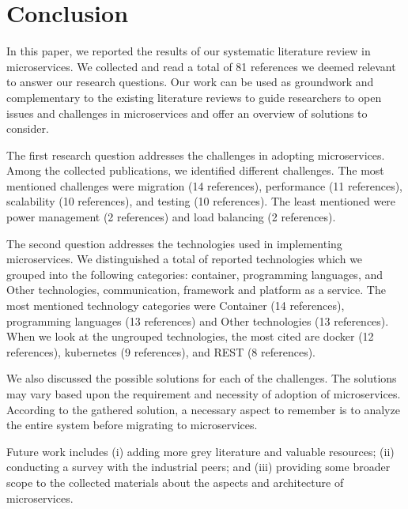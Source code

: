 
\section{Conclusion}\label{sec:conclusion}

In this paper, we reported the results of our systematic literature review in microservices. We collected and read a total of 81 references we deemed relevant to answer our research questions. Our work can be used as groundwork and complementary to the existing literature reviews to guide researchers to open issues and challenges in microservices and offer an overview of solutions to consider.

\par The first research question addresses the challenges in adopting microservices. Among the collected publications, we identified \challengecount different challenges. The most mentioned challenges were migration (14 references), performance (11 references), scalability (10 references), and testing (10 references). The least mentioned were power management (2 references) and load balancing (2 references). 

\par The second question addresses the technologies used in implementing microservices. We distinguished a total of \techcount reported technologies which we grouped into the following categories: container, programming languages, and Other technologies, communication, framework and platform as a service. The most mentioned technology categories were Container (14 references), programming languages (13 references) and Other technologies (13 references). When we look at the ungrouped technologies, the most cited are docker (12 references), kubernetes (9 references), and REST (8 references).
 

We also discussed the possible solutions for each of the challenges. The solutions may vary based upon the requirement and necessity of adoption of microservices. According to the gathered solution, a necessary aspect to remember is to analyze the entire system before migrating to microservices.

Future work includes (i) adding more grey literature and valuable resources; (ii) conducting a survey with the industrial peers; and (iii) providing some broader scope to the collected materials about the aspects and architecture of microservices.







